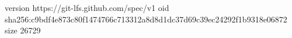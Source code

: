 version https://git-lfs.github.com/spec/v1
oid sha256:c9bdf4e873c80f1474766c713312a8d8d1dc37d69c39ec24292f1b9318e06872
size 26729
